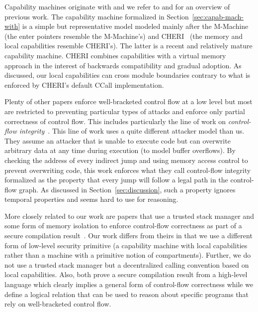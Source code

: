\documentclass[format=acmsmall, review=true, screen=true]{acmart}
\renewcommand{\sectionname}{Section}
\newcommand\lau[1]{{\color{purple} \sf \footnotesize {LS: #1}}\\}
\renewcommand\lau[1]{}
\begin{document}
Capability machines originate with \citet{Dennis:1966:PSM:365230.365252} and we refer to \citet{Levy1984capability} and \citet{Watson2015Cheri} for an overview of previous work.
The capability machine formalized in \sectionname~\ref{sec:capab-mach-with} is a simple but representative model modeled mainly after the M-Machine~\citep{Carter:1994:HSF:195473.195579} (the enter pointers resemble the M-Machine's) and CHERI~\citep{Watson2015Cheri,Woodruff:2014:CCM:2665671.2665740} (the memory and local capabilities resemble CHERI's).
The latter is a recent and relatively mature capability machine. CHERI combines capabilities with a virtual memory approach in the interest of backwards compatibility and gradual adoption.
As discussed, our local capabilities can cross module boundaries contrary to what is enforced by CHERI's default CCall implementation.

Plenty of other papers\lau{If there are plenty, then I guess we should cite more than one?}
enforce well-bracketed control flow at a low level but most are restricted to preventing particular types of attacks and enforce only partial correctness of control flow.
This includes particularly the line of work on \emph{control-flow integrity}~\citep{abadi_control-flow_2005}.
This line of work uses a quite different attacker model than us.
They assume an attacker that is unable to execute code but can overwrite arbitrary data at any time during execution (to model buffer overflows).
By checking the address of every indirect jump and using memory access control to prevent overwriting code, this work enforces what they call control-flow integrity formalized as the property that every jump will follow a legal path in the control-flow graph.
As discussed in \sectionname~\ref{sec:discussion}, such a property ignores temporal properties and seems hard to use for reasoning.

More closely related to our work are papers that use a trusted stack manager and
some form of memory isolation to enforce control-flow correctness as part of a
secure compilation
result~\citep{patrignani_modular_2016-1,juglaret_beyond_2016-1}. Our work
differs from theirs in that we use a different form of low-level security
primitive (a capability machine with local capabilities rather than a machine
with a primitive notion of compartments). Further, we do not use a trusted stack
manager but a decentralized calling convention based on local
capabilities. Also, both prove a secure compilation result from a high-level
language which clearly implies a general form of control-flow correctness
while we define a logical relation that can be used to reason about
specific programs that rely on well-bracketed control flow.
\end{document}
